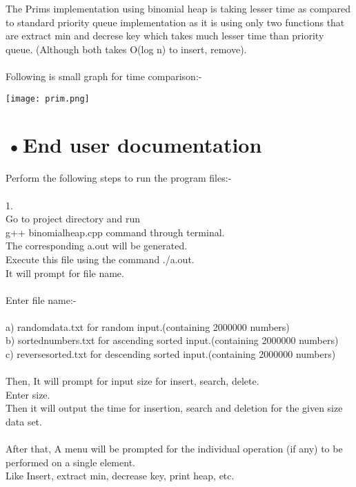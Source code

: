 \documentclass[10pt,a4paper]{article}
\begin{document}
The Prims implementation using binomial heap is taking lesser time as compared to standard priority queue implementation as it is using only two functions that are extract min and decrese key which takes much lesser time than priority queue. (Although both takes O(log n) to insert, remove). \\ \\

Following is small graph for time comparison:-


\texttt{[image: prim.png]} 

   \section*{•End user documentation} 


	Perform the following steps to run the program files:- \\ \\
1. \\Go to project directory and run \\
g++ binomialheap.cpp command through terminal.\\
The corresponding a.out will be generated. \\
Execute this file using the command ./a.out.\\
It will prompt for file name.\\ \\
Enter file name:- \\ \\
a) randomdata.txt for random input.(containing 2000000 numbers)\\
b) sortednumbers.txt for ascending sorted input.(containing 2000000 numbers)\\
c) reversesorted.txt for descending sorted input.(containing 2000000 numbers)\\ \\

Then, It will prompt for input size for insert, search, delete.\\
Enter size.\\

Then it will output the time for insertion, search and deletion for the given size data set.\\ \\
After that,
A menu will be prompted for the individual operation (if any) to be performed on a single element.\\
Like Insert, extract min, decrease key, print heap, etc.\\ \\ \\
	
\end{document}
